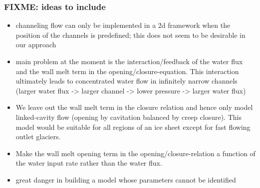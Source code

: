 \documentclass[hide notes,intlimits]{beamer}
\begin{document}
{
} 


\begin{frame}
  \frametitle{FIXME: ideas to include}

\scriptsize
  \begin{itemize}
  \item channeling flow can only be implemented in a 2d framework when the position of the channels is predefined; this does not seem to be desirable in our approach
  \item main problem at the moment is the interaction/feedback of the water flux and the wall melt term in the opening/closure-equation. This interaction ultimately leads to concentrated water flow in infinitely narrow channels (larger water flux ->  larger channel -> lower pressure -> larger water flux)
  \item We leave out the wall melt term in the closure relation and hence only model linked-cavity flow (opening by cavitation balanced by creep closure). This model would be suitable for all regions of an ice sheet except for fast flowing outlet glaciers.
  \item Make the wall melt opening term in the opening/closure-relation a function of the water input rate rather than the water flux.
  \item \alert{great danger} in building a model whose parameters cannot be identified
  \end{itemize}
\end{frame}
\end{document}
